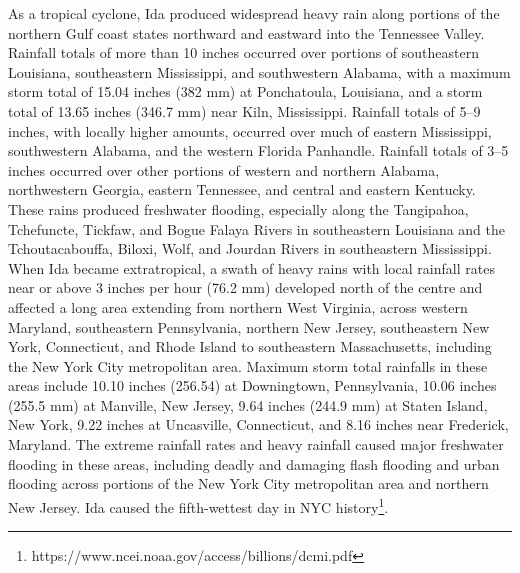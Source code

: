 As  a tropical cyclone, Ida produced widespread heavy rain along portions of the northern Gulf coast states northward and eastward into the Tennessee Valley. Rainfall totals of more than 10 inches occurred over portions of southeastern Louisiana, southeastern Mississippi, and southwestern Alabama, with a maximum storm total of 15.04 inches (382 mm) at Ponchatoula, Louisiana, and a storm total of 13.65 inches (346.7 mm) near Kiln, Mississippi. Rainfall totals of 5–9 inches, with locally higher amounts, occurred over much of eastern Mississippi, southwestern Alabama, and the western Florida Panhandle. Rainfall totals of 3–5 inches occurred over other portions of western and northern Alabama, northwestern Georgia, eastern Tennessee, and central and eastern Kentucky. These rains produced freshwater flooding, especially along the Tangipahoa, Tchefuncte, Tickfaw, and Bogue Falaya Rivers in southeastern Louisiana and the Tchoutacabouffa, Biloxi, Wolf, and Jourdan Rivers in southeastern Mississippi. When Ida became extratropical, a swath of heavy rains with local rainfall rates near or above 3 inches per hour (76.2 mm) developed north of the centre and affected a long area extending from northern West Virginia, across western Maryland, southeastern Pennsylvania, northern New Jersey, southeastern New York, Connecticut, and Rhode Island to southeastern Massachusetts, including the New York City metropolitan area. Maximum storm total rainfalls in these areas include 10.10 inches (256.54) at Downingtown, Pennsylvania, 10.06 inches (255.5 mm) at Manville, New Jersey, 9.64 inches (244.9 mm) at Staten Island, New York, 9.22 inches at Uncasville, Connecticut, and 8.16 inches near Frederick, Maryland. The extreme rainfall rates and heavy rainfall caused major freshwater flooding in these areas, including deadly and damaging flash flooding and urban flooding across portions of the New York City metropolitan area and northern New Jersey. Ida caused the fifth-wettest day in NYC history\footnote{https://www.ncei.noaa.gov/access/billions/dcmi.pdf}.

